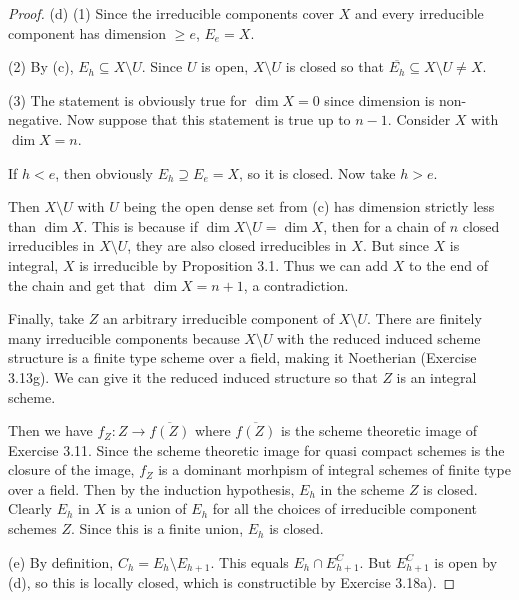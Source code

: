 \begin{proof}
	(d) (1) Since the irreducible components cover $X $ and every irreducible component has dimension $\ge e $, $E_e = X $.

	(2) By (c), $E_h \subseteq X \setminus U $.
	Since $U $ is open, $X \setminus U $ is closed so that $\overline{E_h} \subseteq X \setminus U\ne X  $.

	(3) The statement is obviously true for $\dim X = 0 $ since dimension is non-negative.
	Now suppose that this statement is true up to $n-1 $.
	Consider $X $ with $\dim X =n$.

	If $h < e $, then obviously $E_h \supseteq E_e = X $, so it is closed.
	Now take $h > e $.

	Then $X \setminus U $ with $U $ being the open dense set from (c) has dimension strictly less than $\dim X $.
	This is because if $\dim X \setminus U = \dim X $, then for a chain of $n $ closed irreducibles in $X \setminus U $, they are also closed irreducibles in $X $.
	But since $X $ is integral, $X $ is irreducible by Proposition 3.1.
	Thus we can add $X $ to the end of the chain and get that $\dim X = n+1 $, a contradiction.

	Finally, take $Z $ an arbitrary irreducible component of $X \setminus U $.
	There are finitely many irreducible components because $X \setminus U $ with the reduced induced scheme structure is a finite type scheme over a field, making it Noetherian (Exercise 3.13g).
	We can give it the reduced induced structure so that $Z $ is an integral scheme.

	Then we have $f_Z: Z\to \overline{f(Z)}  $ where $\overline{f(Z)}  $ is the scheme theoretic image of Exercise 3.11.
	Since the scheme theoretic image for quasi compact schemes is the closure of the image, $f_Z $ is a dominant morhpism of integral schemes of finite type over a field.
	Then by the induction hypothesis, $E_{h} $ in the scheme $Z $ is closed.
	Clearly $E_h $ in $X $ is a union of $E_{h} $ for all the choices of irreducible component schemes $Z $.
	Since this is a finite union, $E_h $ is closed.

	(e) By definition, $C_h = E_h \setminus E_{h+1} $.
	This equals $E_h \cap E_{h+1}^C $.
	But $E_{h+1}^C $ is open by (d), so this is locally closed, which is constructible by Exercise 3.18a).
\end{proof}

